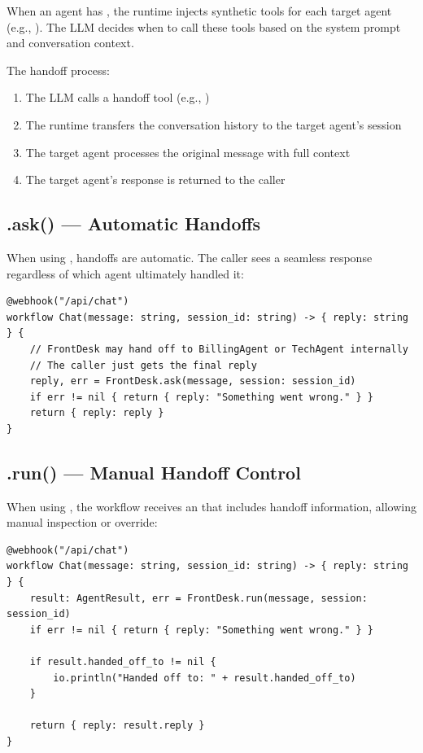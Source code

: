 When an agent has , the runtime injects synthetic tools for each target agent (e.g., ). The LLM decides when to call these tools based on the system prompt and conversation context.

The handoff process:

\begin{enumerate}
    \item The LLM calls a handoff tool (e.g., )
    \item The runtime transfers the conversation history to the target agent's session
    \item The target agent processes the original message with full context
    \item The target agent's response is returned to the caller
\end{enumerate}

\subsection{.ask() --- Automatic Handoffs}

When using , handoffs are automatic. The caller sees a seamless response regardless of which agent ultimately handled it:

\begin{lstlisting}
@webhook("/api/chat")
workflow Chat(message: string, session_id: string) -> { reply: string } {
    // FrontDesk may hand off to BillingAgent or TechAgent internally
    // The caller just gets the final reply
    reply, err = FrontDesk.ask(message, session: session_id)
    if err != nil { return { reply: "Something went wrong." } }
    return { reply: reply }
}
\end{lstlisting}

\subsection{.run() --- Manual Handoff Control}

When using , the workflow receives an  that includes handoff information, allowing manual inspection or override:

\begin{lstlisting}
@webhook("/api/chat")
workflow Chat(message: string, session_id: string) -> { reply: string } {
    result: AgentResult, err = FrontDesk.run(message, session: session_id)
    if err != nil { return { reply: "Something went wrong." } }

    if result.handed_off_to != nil {
        io.println("Handed off to: " + result.handed_off_to)
    }

    return { reply: result.reply }
}
\end{lstlisting}

